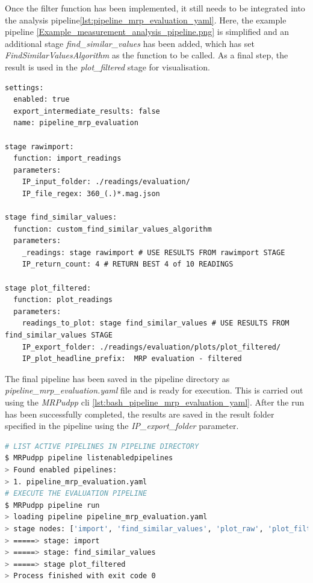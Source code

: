 Once the filter function has been implemented, it still needs to be
integrated into the analysis
pipeline\ref{lst:pipeline_mrp_evaluation_yaml}. Here, the example
pipeline \ref{Example_measurement_analysis_pipeline.png} is simplified
and an additional stage \emph{find\_similar\_values} has been added,
which has set \emph{FindSimilarValuesAlgorithm} as the function to be
called. As a final step, the result is used in the \emph{plot\_filtered}
stage for visualisation.

\begin{lstlisting}[caption={User defined processing pipeline using custom implemented filter algorithm}, label=lst:pipeline_mrp_evaluation_yaml]
settings:
  enabled: true
  export_intermediate_results: false
  name: pipeline_mrp_evaluation

stage rawimport:
  function: import_readings
  parameters:
    IP_input_folder: ./readings/evaluation/
    IP_file_regex: 360_(.)*.mag.json

stage find_similar_values:
  function: custom_find_similar_values_algorithm
  parameters:
    _readings: stage rawimport # USE RESULTS FROM rawimport STAGE
    IP_return_count: 4 # RETURN BEST 4 of 10 READINGS

stage plot_filtered:
  function: plot_readings
  parameters:
    readings_to_plot: stage find_similar_values # USE RESULTS FROM find_similar_values STAGE
    IP_export_folder: ./readings/evaluation/plots/plot_filtered/
    IP_plot_headline_prefix:  MRP evaluation - filtered
\end{lstlisting}

The final pipeline has been saved in the pipeline directory as
\emph{pipeline\_mrp\_evaluation.yaml} file and is ready for execution.
This is carried out using the \emph{MRPudpp} \gls{cli}
\ref{lst:bash_pipeline_mrp_evaluation_yaml}. After the run has been
successfully completed, the results are saved in the result folder
specified in the pipeline using the \emph{IP\_export\_folder} parameter.

\begin{lstlisting}[language=bash, caption={Bash result log of evaluation pipeline run}, label=lst:bash_pipeline_mrp_evaluation_yaml]
# LIST ACTIVE PIPELINES IN PIPELINE DIRECTORY 
$ MRPudpp pipeline listenabledpipelines
> Found enabled pipelines:
> 1. pipeline_mrp_evaluation.yaml
# EXECUTE THE EVALUATION PIPELINE
$ MRPudpp pipeline run
> loading pipeline pipeline_mrp_evaluation.yaml
> stage nodes: ['import', 'find_similar_values', 'plot_raw', 'plot_filtered']
> =====> stage: import 
> =====> stage: find_similar_values 
> =====> stage plot_filtered 
> Process finished with exit code 0
\end{lstlisting}

